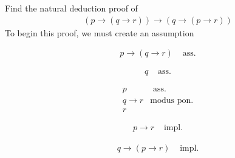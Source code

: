 \documentclass[a4paper]{article}
\theoremstyle{plain}
\theoremstyle{definition}
\newtheorem{exmp}{Example}[section]
\theoremstyle{remark}
\begin{document}
\begin{tcolorbox}[colback=black!3!white,colframe=black!60!white,title=\begin{exmp}Natural Deduction Example \label{Natural Deduction Example}\end{exmp}]
        Find the natural deduction proof of
                \begin{align}
                (p\to (q\to r))\to (q\to (p\to r))
                \end{align}
		To begin this proof, we must create an assumption
		\begin{tcolorbox}[minipage,colback=white,arc=0pt,outer arc=0pt]
		\centering
		\begin{align}
			p \to (q\to r)& \text{ ass.}
		\end{align}
		\begin{tcolorbox}[minipage,colback=white,arc=0pt,outer arc=0pt]
		\centering
		\begin{align}
			q & \text{ ass.}
		\end{align}
		\begin{tcolorbox}[minipage,colback=white,arc=0pt,outer arc=0pt]
		\centering
		\begin{align}
			p &\text{ ass.} \\
			q \to r & \text{modus pon.} \\
			r 
		\end{align}
		\end{tcolorbox}
		\begin{align}
			p\to r & \text{ impl.}
		\end{align}
		\end{tcolorbox}
		\begin{align}
			q\to (p\to r) & \text{ impl.}
		\end{align}
		\end{tcolorbox}
\end{tcolorbox}
\end{document}
